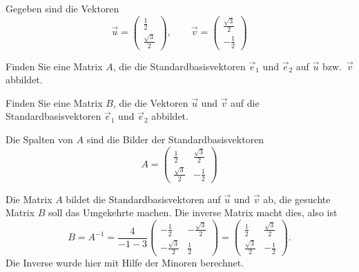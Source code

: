 Gegeben sind die Vektoren
\[
\vec u = \begin{pmatrix}\frac12\\\frac{\sqrt{3}}2\end{pmatrix},
\qquad
\vec v = \begin{pmatrix}\frac{\sqrt{3}}2\\-\frac12\end{pmatrix}
\]
\begin{teilaufgaben}
\item
Finden Sie eine Matrix $A$, die die Standardbasisvektoren $\vec e_1$ und
$\vec e_2$ auf $\vec u$ bzw.~$\vec v$ abbildet.
\item
Finden Sie eine Matrix $B$, die die Vektoren $\vec u$ und $\vec v$ auf
die Standardbasisvektoren $\vec e_1$ und $\vec e_2$ abbildet.
\end{teilaufgaben}


\begin{loesung}
\begin{teilaufgaben}
\item Die Spalten von $A$ sind die Bilder der Standardbasisvektoren
\[
A=\begin{pmatrix}
\frac12         &\frac{\sqrt{3}}2\\
\frac{\sqrt{3}}2&-\frac12
\end{pmatrix} 
\]
\item
Die Matrix $A$ bildet die Standardbasisvektoren auf $\vec u$ und $\vec v$
ab, die gesuchte Matrix $B$ soll das Umgekehrte machen.
Die inverse Matrix macht dies, also ist 
\[
B=A^{-1} = \dfrac{4}{-1-3}\begin{pmatrix}
-\frac12         &-\frac{\sqrt{3}}2\\
-\frac{\sqrt{3}}2&\frac12
\end{pmatrix} 
= \begin{pmatrix}
\frac12         &\frac{\sqrt{3}}2\\
\frac{\sqrt{3}}2&-\frac12
\end{pmatrix} .
\]
Die Inverse wurde hier mit Hilfe der Minoren berechnet.
\end{teilaufgaben}
\end{loesung}




